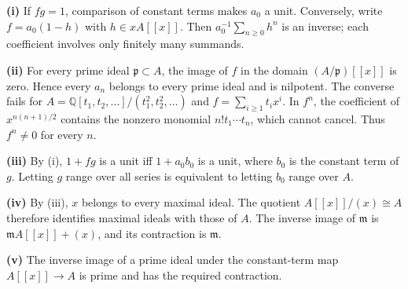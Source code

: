\textbf{(i)} If $fg=1$, comparison of constant terms makes $a_0$ a unit. Conversely, write $f=a_0(1-h)$ with $h\in xA[[x]]$. Then $a_0^{-1}\sum_{n\geq0}h^n$ is an inverse; each coefficient involves only finitely many summands.

\textbf{(ii)} For every prime ideal $\mathfrak p\subset A$, the image of $f$ in the domain $(A/\mathfrak p)[[x]]$ is zero. Hence every $a_n$ belongs to every prime ideal and is nilpotent. The converse fails for $A=\mathbb Q[t_1,t_2,\ldots]/(t_1^2,t_2^2,\ldots)$ and $f=\sum_{i\geq1}t_ix^i$. In $f^n$, the coefficient of $x^{n(n+1)/2}$ contains the nonzero monomial $n!t_1\cdots t_n$, which cannot cancel. Thus $f^n\ne0$ for every $n$.

\textbf{(iii)} By (i), $1+fg$ is a unit iff $1+a_0b_0$ is a unit, where $b_0$ is the constant term of $g$. Letting $g$ range over all series is equivalent to letting $b_0$ range over $A$.

\textbf{(iv)} By (iii), $x$ belongs to every maximal ideal. The quotient $A[[x]]/(x)\cong A$ therefore identifies maximal ideals with those of $A$. The inverse image of $\mathfrak m$ is $\mathfrak m A[[x]]+(x)$, and its contraction is $\mathfrak m$.

\textbf{(v)} The inverse image of a prime ideal under the constant-term map $A[[x]]\to A$ is prime and has the required contraction.
